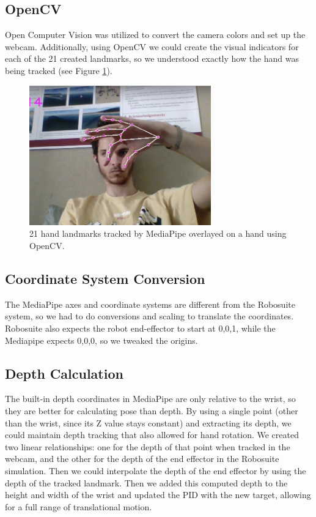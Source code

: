 \documentclass{article}
\begin{document}
\subsection{OpenCV}
Open Computer Vision was utilized to convert the camera colors and set up the webcam. Additionally, using OpenCV we could create the visual indicators for each of the 21 created landmarks, so we understood exactly how the hand was being tracked (see Figure \ref{fig:hand-landmarks-webcam}).
\begin{figure}[H]
  \centering
  \includegraphics[width=0.7\textwidth]{hand-landmarks-webcam.jpeg}
  \caption{21 hand landmarks tracked by MediaPipe overlayed on a hand using OpenCV.}
  \label{fig:hand-landmarks-webcam}
\end{figure}
\subsection{Coordinate System Conversion}
The MediaPipe axes and coordinate systems are different from the Robosuite system, so we had to do conversions and scaling to translate the coordinates. Robosuite also expects the robot end-effector to start at 0,0,1, while the Mediapipe expects 0,0,0, so we tweaked the origins. 
\subsection{Depth Calculation}
The built-in depth coordinates in MediaPipe are only relative to the wrist, so they are better for calculating pose than depth. By using a single point (other than the wrist, since its Z value stays constant) and extracting its depth, we could maintain depth tracking that also allowed for hand rotation. We created two linear relationships: one for the depth of that point when tracked in the webcam, and the other for the depth of the end effector in the Robosuite simulation. Then we could interpolate the depth of the end effector by using the depth of the tracked landmark. Then we added this computed depth to the height and width of the wrist and updated the PID with the new target, allowing for a full range of translational motion.
\end{document}
